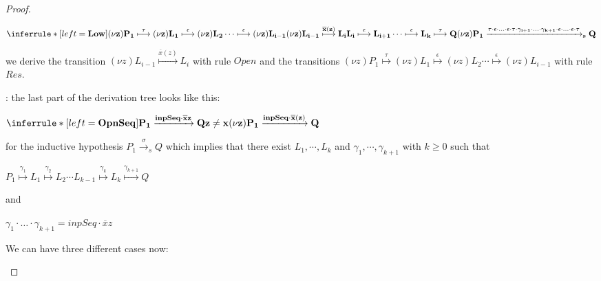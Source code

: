 \begin{proposition}
\begin{proof}
\begin{description}
\begin{description}
\begin{center}
	      $\inferrule* [left=\bf{Low}]{
		  (\nu z)P_{1}\stackrel{\tau}{\longmapsto} (\nu z)L_{1}
			      \stackrel{\epsilon}{\longmapsto} (\nu z)L_{2}
		  \cdots
			      \stackrel{\epsilon}{\longmapsto} (\nu z) L_{i-1}
		\\
		(\nu z) L_{i-1} \stackrel{\overline{x}(z)}{\longmapsto} L_{i}
		\\
			      L_{i} \stackrel{\epsilon}{\longmapsto} L_{i+1}
		  \cdots 
			      \stackrel{\epsilon}{\longmapsto} L_{k}
			      \stackrel{\tau}{\longmapsto} Q
	      }{
		(\nu z)P_{1} \xrightarrow{\tau \cdot \epsilon \cdot \ldots \cdot \epsilon \cdot \tau \cdot \gamma_{i+1}\cdot \ldots \cdot \gamma_{k+1} \cdot \epsilon \cdot \ldots \cdot \epsilon \cdot \tau}_{s} Q
	      }$	  
	    \end{center}
	    we derive the transition $ (\nu z) L_{i-1} \stackrel{\overline{x}(z)}{\longmapsto} L_{i}$ with rule $Open$ and the transitions $(\nu z)P_{1}\stackrel{\tau}{\longmapsto}(\nu z)L_{1} \stackrel{\epsilon}{\longmapsto} (\nu z)L_{2}\cdots \stackrel{\epsilon}{\longmapsto} (\nu z) L_{i-1}$ with rule $Res$.
	\end{description}
      \item[$OpnSeq$]: 
	the last part of the derivation tree looks like this:
	\begin{center}
	  $\inferrule* [left=\bf{OpnSeq}]{
	      P_{1} \xrightarrow{inpSeq \cdot \overline{x}z} Q
	    \\ 
	      z\neq x
	  }{
	      (\nu z)P_{1} \xrightarrow{inpSeq \cdot \overline{x}(z)} Q
	  }$	 
	\end{center}
	for the inductive hypothesis $P_{1} \xrightarrow{\sigma}_{s} Q$ which implies that there exist $L_{1}, \cdots, L_{k}$ and $\gamma_{1}, \cdots, \gamma_{k+1}$ with $k\geq 0$ such that 
	\begin{center}
	  $P_{1} \stackrel{\gamma_{1}}{\longmapsto} L_{1}  \stackrel{\gamma_{2}}{\longmapsto} L_{2} \cdots L_{k-1} \stackrel{\gamma_{k}}{\longmapsto} L_{k} \stackrel{\gamma_{k+1}}{\longmapsto} Q$ 
	\end{center}
	and 
	\begin{center}
	  $\gamma_{1} \cdot \ldots \cdot \gamma_{k+1} =  inpSeq \cdot \overline{x}z$
	\end{center}
	We can have three different cases now: 
\end{description}
\end{proof}
\end{proposition}
